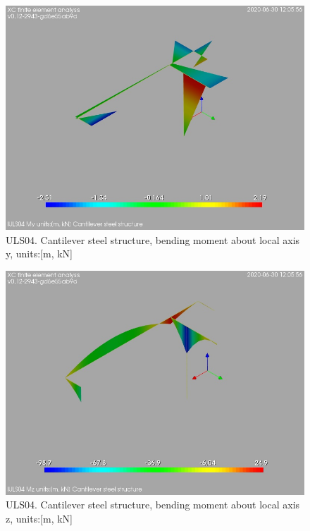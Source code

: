 \begin{figure}
\begin{center}
\includegraphics[width=\linewidth]{ramp_wall/resLC/text/graphics/resSimplLC/lULS04steelMembersMy}
\caption{ULS04. Cantilever steel structure, bending moment about local axis y, units:[m, kN]}
\end{center}
\end{figure}
\begin{figure}
\begin{center}
\includegraphics[width=\linewidth]{ramp_wall/resLC/text/graphics/resSimplLC/lULS04steelMembersMz}
\caption{ULS04. Cantilever steel structure, bending moment about local axis z, units:[m, kN]}
\end{center}
\end{figure}
